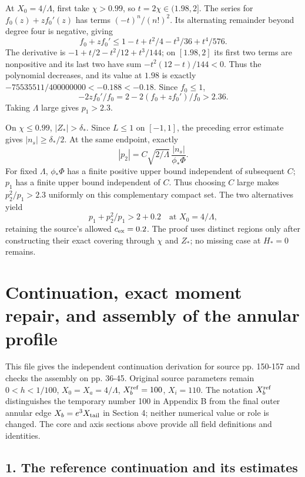 \documentclass[10pt,a4paper]{article}
\begin{document}
At \(X_0=4/\Lambda\), first take \(\chi>0.99\), so \(t=2\chi\in(1.98,2]\). The series for \(f_0(z)+zf_0'(z)\) has terms \((-t)^n/(n!)^2\). Its alternating remainder beyond degree four is negative, giving
\[
f_0+zf_0'\le1-t+t^2/4-t^3/36+t^4/576.
\]
The derivative is \(-1+t/2-t^2/12+t^3/144\); on \([1.98,2]\) its first two terms are nonpositive and its last two have sum \(-t^2(12-t)/144<0\). Thus the polynomial decreases, and its value at \(1.98\) is exactly \(-75535511/400000000<-0.188<-0.18\). Since \(f_0\le1\),
\[
-2zf_0'/f_0=2-2(f_0+zf_0')/f_0>2.36.
\]
Taking \(\Lambda\) large gives \(p_1>2.3\).

On \(\chi\le0.99\), \(|Z_*|>\delta_*\). Since \(L\le1\) on \([-1,1]\), the preceding error estimate gives \(|n_s|\ge\delta_*/2\). At the same endpoint, exactly
\[
|p_2|=C\sqrt{2/\Lambda}\,\frac{|n_s|}{\phi_*\Phi}.
\]
For fixed \(\Lambda\), \(\phi_*\Phi\) has a finite positive upper bound independent of subsequent \(C\); \(p_1\) has a finite upper bound independent of \(C\). Thus choosing \(C\) large makes \(p_2^2/p_1>2.3\) uniformly on this complementary compact set. The two alternatives yield
\[
p_1+p_2^2/p_1>2+0.2
\quad\text{at }X_0=4/\Lambda,
\]
retaining the source's allowed \(c_{\rm ex}=0.2\). The proof uses distinct regions only after constructing their exact covering through \(\chi\) and \(Z_*\); no missing case at \(H_*=0\) remains.



\section{Continuation, exact moment repair, and assembly of the annular profile}\label{pa:sec:component-continuation}

This file gives the independent continuation derivation for source pp. 150-157 and checks the assembly on pp. 36-45. Original source parameters remain \(0<h<1/100\), \(X_0=X_a=4/\Lambda\), \(X_b^{\rm ref}=100\), \(X_i=110\). The notation \(X_b^{\rm ref}\) distinguishes the temporary number 100 in Appendix B from the final outer annular edge \(X_b=e^3X_{\rm tail}\) in Section 4; neither numerical value or role is changed. The core and axis sections above provide all field definitions and identities.

\subsection{1. The reference continuation and its estimates}
\end{document}
